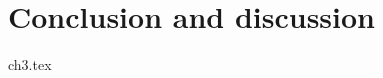 \documentclass{Classe/Dissertate}
\begin{document}
\ChangeColor%
\chapter{Conclusion and discussion}
\ChapFrame%
\LocalTOC%
{ch3.tex}
\OddChapter%
\clearpage



%
%

%


%
\newpage
\pagestyle{empty}
~ 
\newpage
\end{document}
